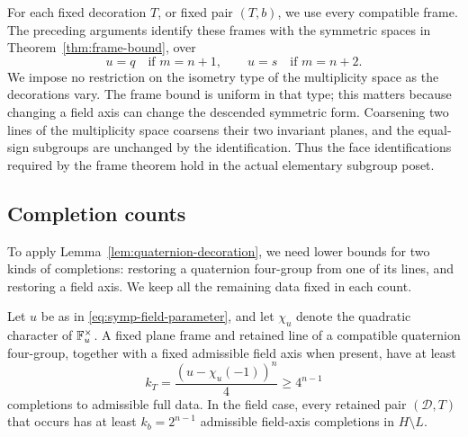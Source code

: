 For each fixed decoration $T$, or fixed pair $(T,b)$, we use every
compatible frame.  The preceding arguments identify these frames
with the symmetric spaces in Theorem~\ref{thm:frame-bound}, over
\begin{equation}\label{eq:symp-field-parameter}
u=q\quad\text{if }m=n+1,\qquad
u=s\quad\text{if }m=n+2.
\end{equation}
We impose no restriction on the isometry type of the multiplicity
space as the decorations vary.  The frame bound is uniform in that
type; this matters because changing a field axis can change the
descended symmetric form.  Coarsening two lines of the multiplicity
space coarsens their two invariant planes, and the equal-sign
subgroups are unchanged by the identification.  Thus the face
identifications required by the frame theorem hold in the actual
elementary subgroup poset.

\subsection{Completion counts}

To apply Lemma~\ref{lem:quaternion-decoration}, we need lower bounds
for two kinds of completions: restoring a quaternion four-group
from one of its lines, and restoring a field axis.  We keep all the
remaining data fixed in each count.

\begin{lemma}\label{lem:symp-completions}
Let $u$ be as in \eqref{eq:symp-field-parameter}, and let
$\chi_u$ denote the quadratic character of $\mathbb F_u^\times$.
A fixed plane frame and retained line of a compatible quaternion
four-group, together with a fixed admissible field axis when present,
have at least
\[
k_T=\frac{(u-\chi_u(-1))^n}{4}\geq4^{n-1}
\]
completions to admissible full data.  In the field case, every
retained pair $(\mathcal D,T)$ that occurs has at least
$k_b=2^{n-1}$ admissible field-axis completions in $H\setminus L$.
\end{lemma}


